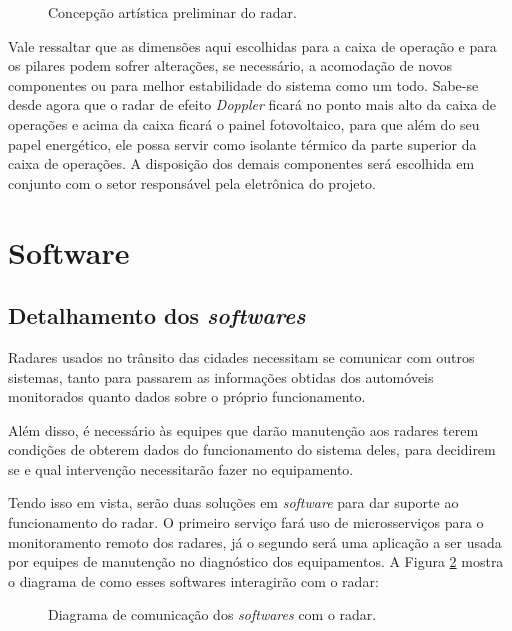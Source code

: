 \begin{figure}[h]
    \caption{\label{fig:radop} Concepção artística preliminar do radar.}
\end{figure}

Vale ressaltar que as dimensões aqui escolhidas para a caixa de operação e para os pilares podem sofrer alterações, se necessário, a acomodação de novos componentes ou para melhor estabilidade do sistema como um todo. Sabe-se desde agora que o radar de efeito \textit{Doppler} ficará no ponto mais alto da caixa de operações e acima da caixa ficará o painel fotovoltaico, para que além do seu papel energético, ele possa servir como isolante térmico da parte superior da caixa de operações. A disposição dos demais componentes será escolhida em conjunto com o setor responsável pela eletrônica do projeto.

\section{Software}

\subsection{Detalhamento dos \emph{softwares}}
Radares usados no trânsito das cidades necessitam se comunicar com outros sistemas, tanto para passarem as informações obtidas dos automóveis monitorados quanto dados sobre o próprio funcionamento.

Além disso, é necessário às equipes que darão manutenção aos radares terem condições de obterem dados do funcionamento do sistema deles, para decidirem se e qual intervenção necessitarão fazer no equipamento.

Tendo isso em vista, serão duas soluções em \emph{software} para dar suporte ao funcionamento do radar. O primeiro serviço fará uso de microsserviços para o monitoramento remoto dos radares, já o segundo será uma aplicação a ser usada por equipes de manutenção no diagnóstico dos equipamentos. A Figura \ref{fig:diagrama-in-out-software} mostra o diagrama de como esses softwares interagirão com o radar:

\begin{figure}[!htb]
    \caption{\label{fig:diagrama-in-out-software} Diagrama de comunicação dos \emph{softwares} com o radar.}
\end{figure}

